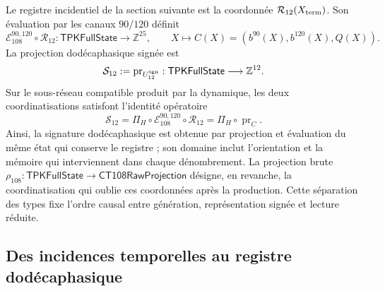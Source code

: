 Le registre incidentiel de la section suivante est la coordonnée
\(\mathcal R_{12}(X_{\rm term})\). Son évaluation par les canaux
\(90/120\) définit
\[
 \mathcal E_{108}^{90,120}\circ\mathcal R_{12}:
 \mathsf{TPKFullState}\longrightarrow\mathbb Z^{25},
 \qquad
 X\longmapsto C(X)=(b^{90}(X),b^{120}(X),Q(X)).
\]
La projection dodécaphasique signée est
\[
 \mathcal S_{12}:=\operatorname{pr}_{U_{12}^{\rm sgn}}:
 \mathsf{TPKFullState}\longrightarrow\mathbb Z^{12}.
\]
Sur le sous-réseau compatible produit par la dynamique, les deux coordinatisations
satisfont l’identité opératoire
\begin{equation}
 \mathcal S_{12}
 =\Pi_H\circ\mathcal E_{108}^{90,120}\circ\mathcal R_{12}
 =\Pi_H\circ\operatorname{pr}_{C}.
 \label{vi:dep:identidad-productor-e108}
\end{equation}
Ainsi, la signature dodécaphasique est obtenue par projection et évaluation du même
état qui conserve le registre ; son domaine inclut l’orientation et la mémoire
qui interviennent dans chaque dénombrement. La projection brute
\(\rho_{108}:\mathsf{TPKFullState}\to\mathsf{CT108RawProjection}\)
désigne, en revanche, la coordinatisation qui oublie ces coordonnées après la
production. Cette séparation des types fixe l’ordre causal entre génération,
représentation signée et lecture réduite.

\subsection{Des incidences temporelles au registre dodécaphasique}
\label{vi:dep:registro}


